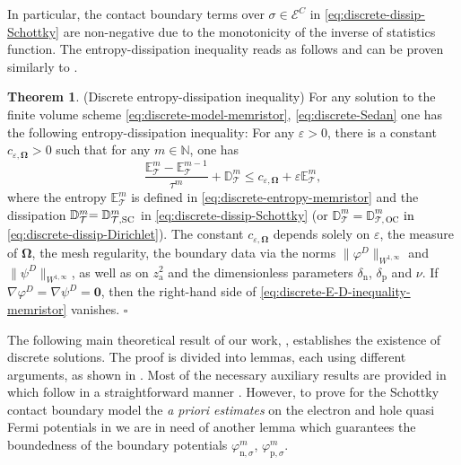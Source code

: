 \documentclass[10pt,a4paper, final]{article}
\newcommand{\reviewerTwo}[1]{\textcolor{black}{#1}}
\def\electrons{\text{n}}
\def\holes{\text{p}}
\def\ions{\text{a}}
\newcommand*{\QEDB}{\null\nobreak\hfill\ensuremath{\square}}%
\theoremstyle{definition}								%
\newtheorem{theorem}{Theorem}
\numberwithin{equation}{section}
\numberwithin{figure}{section}
\numberwithin{theorem}{section}
\begin{document}
In particular, the contact boundary terms over $\sigma \in \mathcal{E}^C$ in \eqref{eq:discrete-dissip-Schottky} are non-negative due to the monotonicity of the inverse of statistics function.
The entropy-dissipation inequality reads as follows and can be proven similarly to \cite[Theorem 4.4]{Abdel2023Existence}.
\begin{theorem}(Discrete entropy-dissipation inequality) \label{thm:discrete-E-D-memristor}
    For any solution to the finite volume scheme \eqref{eq:discrete-model-memristor}, \eqref{eq:discrete-Sedan} one has the following entropy-dissipation inequality: For any $\varepsilon>0$, there is a constant $c_{\varepsilon, \mathbf{\Omega}}>0$ such that for any $m\in\mathbb{N}$, one has
    \begin{equation} \label{eq:discrete-E-D-inequality-memristor}
        \frac{\mathbb{E}_{\mathcal{T}}^m - \mathbb{E}_{\mathcal{T}}^{m-1}}{\tau^m} +  \mathbb{D}_{\mathcal{T}}^m
        \leq c_{\varepsilon, \mathbf{\Omega}} + \varepsilon \mathbb{E}_\mathcal{T}^m,
    \end{equation}
    where the entropy $\mathbb{E}_{\mathcal{T}}^m$ is defined in \eqref{eq:discrete-entropy-memristor} and the dissipation $\mathbb{D}_{\mathcal{T}}^m \reviewerTwo{ = \mathbb{D}_{\mathcal{T}, \text{SC}}^m}$ in \eqref{eq:discrete-dissip-Schottky} (or  \reviewerTwo{$\mathbb{D}_{\mathcal{T}}^m = \mathbb{D}_{\mathcal{T}, \text{OC}}^m$ in} \eqref{eq:discrete-dissip-Dirichlet}).
    The constant $c_{\varepsilon, \mathbf{\Omega}}$ depends solely on $\varepsilon$, the measure of $\mathbf{\Omega}$, the mesh regularity, the boundary data via the norms $ \|\varphi^D\|_{W^{1,\infty}}$ and $\|\psi^D\|_{W^{1,\infty}}$, as well as on $z_{\ions}^2$ and the dimensionless parameters $\delta_\electrons$, $\delta_\holes$ and $\nu$.
    If $\nabla\varphi^D = \nabla\psi^D = \mathbf{0}$, then the right-hand side of \eqref{eq:discrete-E-D-inequality-memristor} vanishes. \QEDB
\end{theorem}
The following main theoretical result of our work, , establishes the existence of discrete solutions.
The proof is divided into lemmas, each using different arguments, as shown in .
Most of the necessary auxiliary results are provided in  which follow in a straightforward manner \cite{Abdel2023Existence}.
However, to prove for the Schottky contact boundary model the \textit{a priori estimates} on the electron and hole quasi Fermi potentials in  we are in need of another lemma which guarantees the boundedness of the boundary potentials $\varphi_{\electrons, \sigma}^m$, $\varphi_{\holes, \sigma}^m$.
\end{document}
